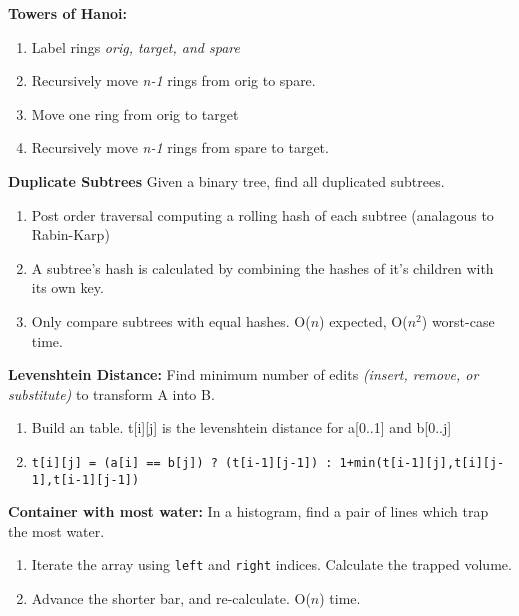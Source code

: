 \documentclass[12pt]{article}
\newcommand{\ON}{O($n$) }
\newcommand{\ONSQ}{O($n^2$) }
\begin{document}
\vspace{5mm}
\noindent
\textbf{Towers of Hanoi:}
\begin{enumerate}
\item Label rings \emph{orig, target, and spare}
\item Recursively move \emph{n-1} rings from orig to spare.
\item Move one ring from orig to target
\item Recursively move \emph{n-1} rings from spare to target.
\end{enumerate}

\vspace{5mm}
\noindent
\textbf{Duplicate Subtrees}
Given a binary tree, find all duplicated subtrees.
\begin{enumerate}
\item Post order traversal computing a rolling hash of each subtree (analagous to Rabin-Karp)
\item A subtree's hash is calculated by combining the hashes of it's children with its own key.
\item Only compare subtrees with equal hashes. \ON expected, \ONSQ worst-case time.
\end{enumerate}


\vspace{5mm}
\noindent
\textbf{Levenshtein Distance:}
Find minimum number of edits \emph{(insert, remove, or substitute)} to transform A into B.
\begin{enumerate}
\item Build an table. t[i][j] is the levenshtein distance for a[0..1] and b[0..j]
\item \texttt{t[i][j] = (a[i] == b[j]) ? (t[i-1][j-1]) : 1+min(t[i-1][j],t[i][j-1],t[i-1][j-1])}
\end{enumerate}


\vspace{5mm}
\noindent
\textbf{Container with most water:}
In a histogram, find a pair of lines which trap the most water.
\begin{enumerate}
\item Iterate the array using \texttt{left} and \texttt{right} indices. Calculate the trapped volume.
\item Advance the shorter bar, and re-calculate. \ON time.
\end{enumerate}
\vspace{5mm}
\end{document}
